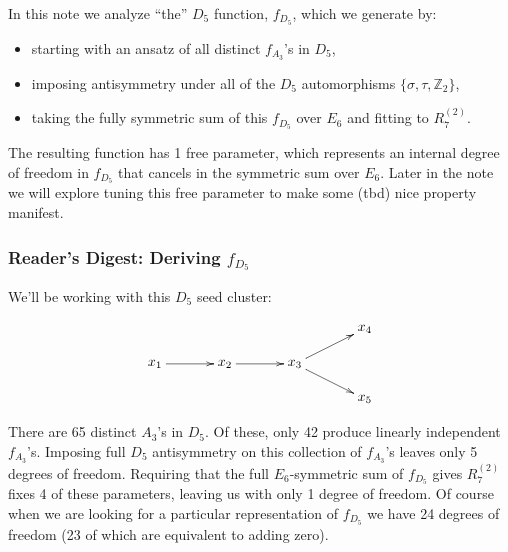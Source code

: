 \documentclass[12pt]{article}
\def\a{\mathcal{A}}
\def\fd5{f_{D_5}}
\def\fa3{f_{A_3}}
\def\a2{A_2}
\def\a3{A_3}
\def\d5{D_5}
\def\e6{E_6}
\def\r27{R^{(2)}_7}
\begin{document}
\thispagestyle{fancyplain}
 
\fancyhf{} 
 
\cfoot{\fancyplain{}{\thepage}}

\lhead{\textbf{Describing the $\d5$ function} \hfill \today}

In this note we analyze ``the'' $\d5$ function, $\fd5$, which we generate by:
\begin{itemize}
	\item starting with an ansatz of all distinct $\fa3$'s in $\d5$,
	\item imposing antisymmetry under all of the $\d5$ automorphisms $\{\sigma, \tau, \mathbb{Z}_2\}$,
	\item taking the fully symmetric sum of this $\fd5$ over $\e6$ and fitting to $\r27$.
\end{itemize}
The resulting function has 1 free parameter, which represents an internal degree of freedom in $\fd5$ that cancels in the symmetric sum over $\e6$. Later in the note we will explore tuning this free parameter to make some (tbd) nice property manifest.

\subsubsection*{Reader's Digest: Deriving $\fd5$}

We'll be working with this $\d5$ seed cluster:

\begin{equation}
\begin{gathered}
\begin{xy} 0;<1pt,0pt>:<0pt,-1pt>::
	(0,25) *+{x_1} ="1",
	(50,25) *+{x_2} ="2",
	(100,25) *+{x_3} ="3",
	(150,0) *+{x_4} ="4",
	(150,50) *+{x_5} ="5",
	"1", {\ar"2"},
	"2", {\ar"3"},
	"3", {\ar"4"},
	"3", {\ar"5"},
\end{xy}
\end{gathered}
\end{equation}

There are 65 distinct $\a3$'s in $\d5$. Of these, only 42 produce linearly independent $\fa3$'s. Imposing full $\d5$ antisymmetry on this collection of $\fa3$'s leaves only 5 degrees of freedom. Requiring that the full $\e6$-symmetric sum of $\fd5$ gives $\r27$ fixes 4 of these parameters, leaving us with only 1 degree of freedom. Of course when we are looking for a particular representation of $\fd5$ we have 24 degrees of freedom (23 of which are equivalent to adding zero).\\
\end{document}
